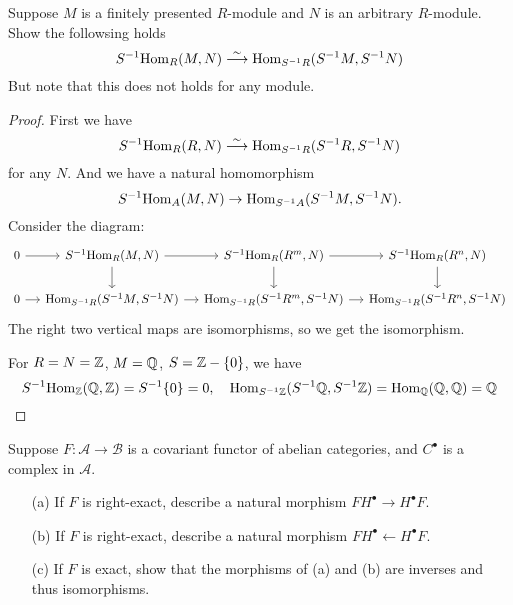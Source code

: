 \begin{exercise}
Suppose $M$ is a finitely presented $R$-module and $N$ is an arbitrary $R$-module. Show the followsing holds
\[S^{-1}\mathrm{Hom}_R(M,N)\stackrel{\sim}{\longrightarrow}\mathrm{Hom}_{S^{-1}R}(S^{-1}M,S^{-1}N)\]
But note that this does not holds for any module.
\end{exercise}
\begin{proof}
First we have
\[S^{-1}\mathrm{Hom}_R(R,N)\stackrel{\sim}{\longrightarrow}\mathrm{Hom}_{S^{-1}R}(S^{-1}R,S^{-1}N)\]
for any $N$. And we have a natural homomorphism 
\[S^{-1}\mathrm{Hom}_A(M,N)\to \mathrm{Hom}_{S^{-1}A}(S^{-1}M,S^{-1}N).\] 
Consider the diagram:
\[\begin{tikzcd}[column sep=small]
0\ar[r]&S^{-1}\Hom_{R}(M,N)\ar[r]\ar[d]&S^{-1}\Hom_{R}(R^m,N)\ar[d]\ar[r]&S^{-1}\Hom_{R}(R^n,N)\ar[d]\\
0\ar[r]&\Hom_{S^{-1}R}(S^{-1}M,S^{-1}N)\ar[r]&\Hom_{S^{-1}R}(S^{-1}R^m,S^{-1}N)\ar[r]&\Hom_{S^{-1}R}(S^{-1}R^n,S^{-1}N)
\end{tikzcd}\]
The right two vertical maps are isomorphisms, so we get the isomorphism.\par
For $R=N=\mathbb{Z}$, $M=\mathbb{Q}$, $S=\mathbb{Z}-\{0\}$, we have
\[S^{-1}\mathrm{Hom}_{\mathbb{Z}}(\mathbb{Q},\mathbb{Z})=S^{-1}\{0\}=0,\quad \mathrm{Hom}_{S^{-1}\mathbb{Z}}(S^{-1}\mathbb{Q},S^{-1}\mathbb{Z})=\mathrm{Hom}_{\mathbb{Q}}(\mathbb{Q},\mathbb{Q})=\mathbb{Q}\]
\end{proof}
\begin{exercise}
Suppose $F:\mathcal{A}\to\mathcal{B}$ is a covariant functor of abelian categories, and $C^\bullet$ is a complex in $\mathcal{A}$.
\begin{enumerate}
\item[(a)]If $F$ is right-exact, describe a natural morphism $FH^\bullet\to H^\bullet F$.
\item[(b)]If $F$ is right-exact, describe a natural morphism $FH^\bullet\leftarrow H^\bullet F$.
\item[(c)]If $F$ is exact, show that the morphisms of (a) and (b) are inverses and thus isomorphisms.
\end{enumerate}
\end{exercise}

